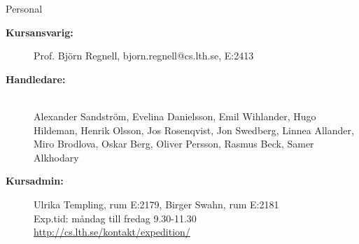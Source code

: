 \ifkompendium\else
\begin{SlideExtra}{Personal \CurrentYear}\SlideFontSmall
\begin{description}
\item [\bfseries Kursansvarig:] Prof. Björn Regnell, bjorn.regnell@cs.lth.se, E:2413
\item [\bfseries Handledare:]\\
Alexander	Sandström, 
Evelina	Danielsson, 
Emil	Wihlander, 
Hugo	Hildeman, 
Henrik	Olsson, 
Jos	Rosenqvist, 
Jon	Swedberg, 
Linnea	Allander, 
Miro	Brodlova, 
Oskar	Berg, 
Oliver	Persson, 
Rasmus	Beck, 
Samer	Alkhodary
\item [\bfseries Kursadmin:]
Ulrika Templing, rum E:2179, Birger Swahn, rum E:2181 \\
Exp.tid: måndag till fredag 9.30-11.30  \\
\url{http://cs.lth.se/kontakt/expedition/} \\
\end{description}
\end{SlideExtra}
\fi


